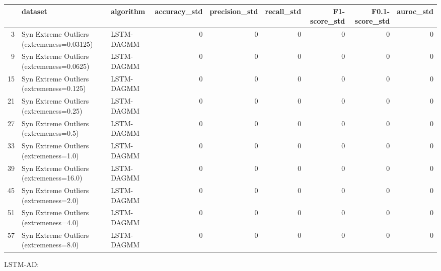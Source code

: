\begin{tabular}{rllrrrrrr}
\hline
    & dataset                                    & algorithm   &   accuracy\_std &   precision\_std &   recall\_std &   F1-score\_std &   F0.1-score\_std &   auroc\_std \\
\hline
  3 & Syn Extreme Outliers (extremeness=0.03125) & LSTM-DAGMM  &              0 &               0 &            0 &              0 &                0 &           0 \\
  9 & Syn Extreme Outliers (extremeness=0.0625)  & LSTM-DAGMM  &              0 &               0 &            0 &              0 &                0 &           0 \\
 15 & Syn Extreme Outliers (extremeness=0.125)   & LSTM-DAGMM  &              0 &               0 &            0 &              0 &                0 &           0 \\
 21 & Syn Extreme Outliers (extremeness=0.25)    & LSTM-DAGMM  &              0 &               0 &            0 &              0 &                0 &           0 \\
 27 & Syn Extreme Outliers (extremeness=0.5)     & LSTM-DAGMM  &              0 &               0 &            0 &              0 &                0 &           0 \\
 33 & Syn Extreme Outliers (extremeness=1.0)     & LSTM-DAGMM  &              0 &               0 &            0 &              0 &                0 &           0 \\
 39 & Syn Extreme Outliers (extremeness=16.0)    & LSTM-DAGMM  &              0 &               0 &            0 &              0 &                0 &           0 \\
 45 & Syn Extreme Outliers (extremeness=2.0)     & LSTM-DAGMM  &              0 &               0 &            0 &              0 &                0 &           0 \\
 51 & Syn Extreme Outliers (extremeness=4.0)     & LSTM-DAGMM  &              0 &               0 &            0 &              0 &                0 &           0 \\
 57 & Syn Extreme Outliers (extremeness=8.0)     & LSTM-DAGMM  &              0 &               0 &            0 &              0 &                0 &           0 \\
\hline
\end{tabular}

LSTM-AD:

